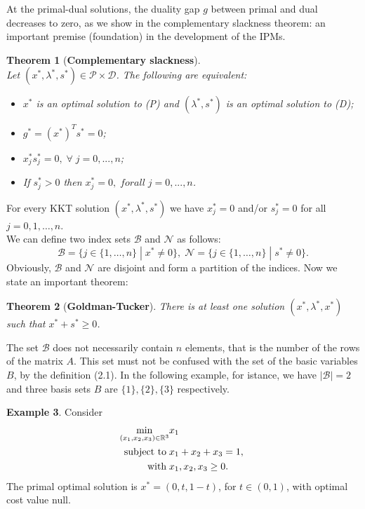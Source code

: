 \documentclass[a4paper,10 pt,titlepage,twoside]{book}
\theoremstyle{plain}
\newtheorem{thm}{Theorem}[chapter]
\theoremstyle{definition}
\newtheorem{ex}[thm]{Example}
\theoremstyle{remark}
\begin{document}
At the primal-dual solutions, the duality gap $g$ between primal and dual decreases to zero, as we show in the complementary slackness theorem: an important premise (foundation) in the development of the IPMs.
\newpage
\begin{thm}[\textbf{Complementary slackness}] \ \\
	Let $(x^{*},\lambda^{*},s^{*})\in\mathcal{P}\times\mathcal{D}$. The following are equivalent:
	\begin{itemize}
		\item $x^{*}$ is an optimal solution to (P) and $(\lambda^{*},s^{*})$ is an optimal solution to (D);
		\item $g^{*} = (x^{*})^{T}s^{*}=0$;
		\item $x^{*}_{j}s^{*}_{j}=0,\;\forall\; j=0,...,n$;
		\item If $s^{*}_{j} > 0$ then $x^{*}_{j}= 0,\;for all\; j=0,...,n$.
	\end{itemize}
\end{thm}

For every KKT solution $(x^{*}, \lambda^{*}, s^{*})$ we have $x_{j}^{*}= 0$ and/or $s_{j}^{*}= 0$ for all $j=0,1,\dots,n$.\\
We can define two index sets $\mathcal{B}$ and $\mathcal{N}$ as follows:
\begin{equation}\label{index}
\mathcal{B} =\{j\in\{1,\dots,n\}\;|\; x^{*} \not= 0\}, \;
\mathcal{N} =\{j\in\{1,\dots,n\}\;|\; s^{*} \not= 0\}.
\end{equation}  
Obviously, $\mathcal{B}$ and $\mathcal{N}$ are disjoint and form a partition of the indices. Now we state an important theorem:
\begin{thm}[\textbf{Goldman-Tucker}]
	There is at least one solution $(x^{*}, \lambda^{*}, x^{*})$ such that $x^{*}+s^{*}\geq0$.
\end{thm}
The set $\mathcal{B}$ does not necessarily contain $n$ elements, that is the number of the rows of the matrix $A$. This set must not be confused with the set of the basic variables $B$, by the definition (2.1). In the following example, for istance, we have $|\mathcal{B}|= 2$ and three basis sets $B$ are $\{1\}, \{2\}, \{3\}$ respectively.
\begin{ex}
Consider
\begin{align*} \min\limits_{(x_{1},x_{2},x_{3})\in\mathbb{R}^{3}} &x_{1}\\ \text{\;subject to\;} &x_{1}+x_{2}+x_{3} = 1,\; \\
 \text{\; with\;} &x_{1}, x_{2}, x_{3} \geq 0.
 \end{align*}
The primal optimal solution is $x^{*}=(0, t, 1-t)$, for $t\in(0,1)$, with optimal cost value null. 	
\end{ex} 
\end{document}
